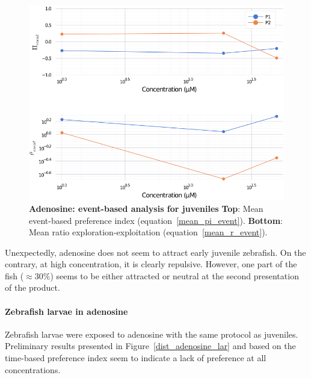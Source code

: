     \begin{figure}[h!]
      \centering
      \includegraphics[width=1\textwidth]{part_2/assets/adenosine_event.png}
      \caption{\textbf{Adenosine: event-based analysis for juveniles} \textbf{Top}: Mean event-based preference index (equation~\ref{mean_pi_event}). \textbf{Bottom}: Mean ratio exploration-exploitation (equation~\ref{mean_r_event}).}
      \label{adenosine_event}
    \end{figure}

  Unexpectedly, adenosine does not seem to attract early juvenile zebrafish. On the contrary, at high concentration, it is clearly repulsive. However, one part of the fish ($\approx 30 \%$) seems to be either attracted or neutral at the second presentation of the product.

  \paragraph{Zebrafish larvae in adenosine} Zebrafish larvae were exposed to adenosine with the same protocol as juveniles. Preliminary results presented in Figure~\ref{dist_adenosine_lar} and based on the time-based preference index seem to indicate a lack of preference at all concentrations.

